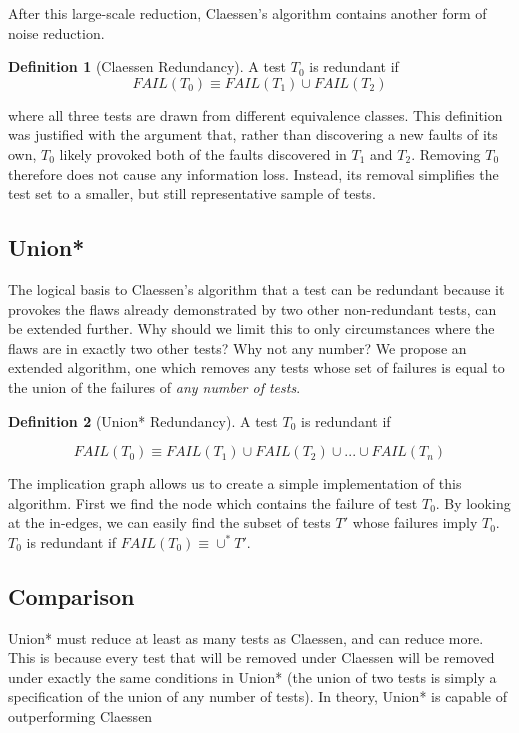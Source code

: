 \documentclass[11pt,twoside]{article}
\newcommand\fail{\mathit{FAIL}}
\theoremstyle{definition}
\newtheorem{defn}{Definition}
\let\cite=\citep
\begin{document}
After this large-scale reduction, Claessen's algorithm contains another form of noise reduction. 

\begin{defn}[Claessen Redundancy]
A test $T_0$ is redundant if
$$\fail (T_0) \equiv \fail(T_1) \cup \fail(T_2)$$
\end{defn}
where all three tests are drawn from different equivalence classes. This definition was justified with the argument that, rather than discovering a new faults of its own, $T_0$ likely provoked both of the faults discovered in $T_1$ and $T_2$. Removing $T_0$ therefore does not cause any information loss. Instead, its removal simplifies the test set to a smaller, but still representative sample of tests.

\subsection{Union*}
The logical basis to Claessen's algorithm that a test can be redundant because it provokes the flaws already demonstrated by two other non-redundant tests\cite{Claessen}, can be extended further. Why should we limit this to only circumstances where the flaws are in exactly two other tests? Why not any number? We propose an extended algorithm, one which removes any tests whose set of failures is equal to the union of the failures of \emph{any number of tests}. 

\begin{defn}[Union* Redundancy]
A test $T_0$ is redundant if

$$\fail (T_0) \equiv \fail(T_1) \cup \fail(T_2) \cup ... \cup \fail(T_n) $$
\end{defn}

The implication graph allows us to create a simple implementation of this algorithm. First we find the node which contains the failure of test $T_0$. By looking at the in-edges, we can easily find the subset of tests $T'$ whose failures imply $T_0$. $T_0$ is redundant if $\fail(T_0) \equiv \cup^* T'$.

\subsection{Comparison}
Union* must reduce at least as many tests as Claessen, and can reduce more. This is because every test that will be removed under Claessen will be removed under exactly the same conditions in Union* (the union of two tests is simply a specification of the union of any number of tests). In theory, Union* is capable of outperforming Claessen
\end{document}
